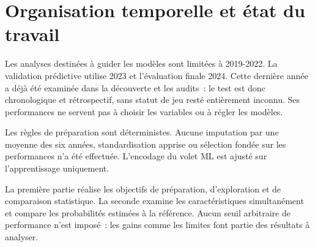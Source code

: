 \section{Organisation temporelle et état du travail}
Les analyses destinées à guider les modèles sont limitées à 2019-2022. La validation
prédictive utilise 2023 et l'évaluation finale 2024. Cette dernière année a déjà été
examinée dans la découverte et les audits~: le test est donc chronologique et
rétrospectif, sans statut de jeu resté entièrement inconnu. Ses performances ne servent
pas à choisir les variables ou à régler les modèles.

Les règles de préparation sont déterministes. Aucune imputation par une moyenne des
six années, standardisation apprise ou sélection fondée sur les performances n'a été
effectuée. L'encodage du volet ML est ajusté sur l'apprentissage uniquement.

La première partie réalise les objectifs de préparation, d'exploration et de
comparaison statistique. La seconde examine les caractéristiques simultanément et
compare les probabilités estimées à la référence. Aucun seuil arbitraire de performance
n'est imposé~: les gains comme les limites font partie des résultats à analyser.

\FloatBarrier
{}
